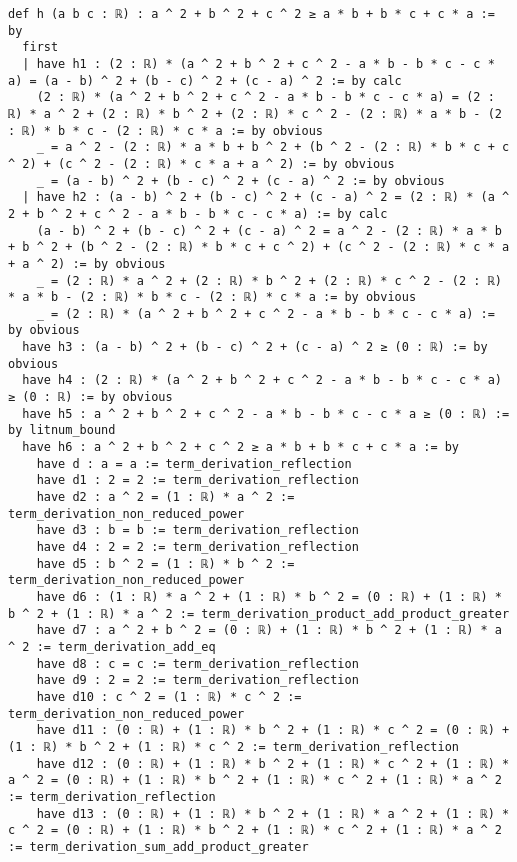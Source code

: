 \documentclass{article}
\begin{document}
\begin{tcolorbox}[colback=white!10, width=\linewidth]
\begin{lstlisting}[language=Lean4]
def h (a b c : ℝ) : a ^ 2 + b ^ 2 + c ^ 2 ≥ a * b + b * c + c * a := by
  first
  | have h1 : (2 : ℝ) * (a ^ 2 + b ^ 2 + c ^ 2 - a * b - b * c - c * a) = (a - b) ^ 2 + (b - c) ^ 2 + (c - a) ^ 2 := by calc
    (2 : ℝ) * (a ^ 2 + b ^ 2 + c ^ 2 - a * b - b * c - c * a) = (2 : ℝ) * a ^ 2 + (2 : ℝ) * b ^ 2 + (2 : ℝ) * c ^ 2 - (2 : ℝ) * a * b - (2 : ℝ) * b * c - (2 : ℝ) * c * a := by obvious
    _ = a ^ 2 - (2 : ℝ) * a * b + b ^ 2 + (b ^ 2 - (2 : ℝ) * b * c + c ^ 2) + (c ^ 2 - (2 : ℝ) * c * a + a ^ 2) := by obvious
    _ = (a - b) ^ 2 + (b - c) ^ 2 + (c - a) ^ 2 := by obvious
  | have h2 : (a - b) ^ 2 + (b - c) ^ 2 + (c - a) ^ 2 = (2 : ℝ) * (a ^ 2 + b ^ 2 + c ^ 2 - a * b - b * c - c * a) := by calc
    (a - b) ^ 2 + (b - c) ^ 2 + (c - a) ^ 2 = a ^ 2 - (2 : ℝ) * a * b + b ^ 2 + (b ^ 2 - (2 : ℝ) * b * c + c ^ 2) + (c ^ 2 - (2 : ℝ) * c * a + a ^ 2) := by obvious
    _ = (2 : ℝ) * a ^ 2 + (2 : ℝ) * b ^ 2 + (2 : ℝ) * c ^ 2 - (2 : ℝ) * a * b - (2 : ℝ) * b * c - (2 : ℝ) * c * a := by obvious
    _ = (2 : ℝ) * (a ^ 2 + b ^ 2 + c ^ 2 - a * b - b * c - c * a) := by obvious
  have h3 : (a - b) ^ 2 + (b - c) ^ 2 + (c - a) ^ 2 ≥ (0 : ℝ) := by obvious
  have h4 : (2 : ℝ) * (a ^ 2 + b ^ 2 + c ^ 2 - a * b - b * c - c * a) ≥ (0 : ℝ) := by obvious
  have h5 : a ^ 2 + b ^ 2 + c ^ 2 - a * b - b * c - c * a ≥ (0 : ℝ) := by litnum_bound
  have h6 : a ^ 2 + b ^ 2 + c ^ 2 ≥ a * b + b * c + c * a := by
    have d : a = a := term_derivation_reflection
    have d1 : 2 = 2 := term_derivation_reflection
    have d2 : a ^ 2 = (1 : ℝ) * a ^ 2 := term_derivation_non_reduced_power
    have d3 : b = b := term_derivation_reflection
    have d4 : 2 = 2 := term_derivation_reflection
    have d5 : b ^ 2 = (1 : ℝ) * b ^ 2 := term_derivation_non_reduced_power
    have d6 : (1 : ℝ) * a ^ 2 + (1 : ℝ) * b ^ 2 = (0 : ℝ) + (1 : ℝ) * b ^ 2 + (1 : ℝ) * a ^ 2 := term_derivation_product_add_product_greater
    have d7 : a ^ 2 + b ^ 2 = (0 : ℝ) + (1 : ℝ) * b ^ 2 + (1 : ℝ) * a ^ 2 := term_derivation_add_eq
    have d8 : c = c := term_derivation_reflection
    have d9 : 2 = 2 := term_derivation_reflection
    have d10 : c ^ 2 = (1 : ℝ) * c ^ 2 := term_derivation_non_reduced_power
    have d11 : (0 : ℝ) + (1 : ℝ) * b ^ 2 + (1 : ℝ) * c ^ 2 = (0 : ℝ) + (1 : ℝ) * b ^ 2 + (1 : ℝ) * c ^ 2 := term_derivation_reflection
    have d12 : (0 : ℝ) + (1 : ℝ) * b ^ 2 + (1 : ℝ) * c ^ 2 + (1 : ℝ) * a ^ 2 = (0 : ℝ) + (1 : ℝ) * b ^ 2 + (1 : ℝ) * c ^ 2 + (1 : ℝ) * a ^ 2 := term_derivation_reflection
    have d13 : (0 : ℝ) + (1 : ℝ) * b ^ 2 + (1 : ℝ) * a ^ 2 + (1 : ℝ) * c ^ 2 = (0 : ℝ) + (1 : ℝ) * b ^ 2 + (1 : ℝ) * c ^ 2 + (1 : ℝ) * a ^ 2 := term_derivation_sum_add_product_greater

\end{lstlisting}
\end{tcolorbox}
\end{document}
